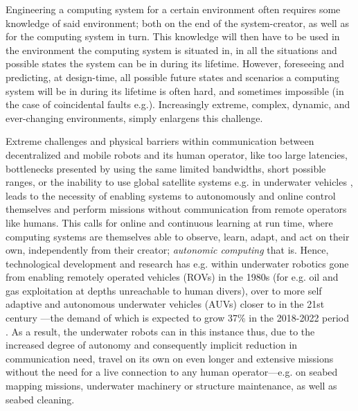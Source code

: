 
Engineering a computing system for a certain environment often requires some knowledge of said environment; both on the end of the system-creator, as well as for the computing system in turn. This knowledge will then have to be used in the environment the computing system is situated in, in all the situations and possible states the system can be in during its lifetime. However, foreseeing and predicting, at design-time, all possible future states and scenarios a computing system will be in during its lifetime is often hard, and sometimes impossible (in the case of coincidental faults e.g.). Increasingly extreme, complex, dynamic, and ever-changing environments, simply enlargens this challenge.

Extreme challenges and physical barriers within communication between decentralized and mobile robots and its human operator, like too large latencies, bottlenecks presented by using the same limited bandwidths, short possible ranges, or the inability to use global satellite systems e.g. in underwater vehicles \cite{petillot_underwater_robots}, leads to the necessity of enabling systems to autonomously and online control themselves and perform missions without communication from remote operators like humans. This calls for online and continuous learning at run time, where computing systems are themselves able to observe, learn, adapt, and act on their own, independently from their creator; \textit{autonomic computing} that is. Hence, technological development and research has e.g. within underwater robotics gone from enabling remotely operated vehicles (ROVs) in the 1980s (for e.g. oil and gas exploitation at depths unreachable to human divers), over to more self adaptive and autonomous underwater vehicles (AUVs) closer to in the 21st century —the demand of which is expected to grow 37\% in the 2018-2022 period \cite{petillot_underwater_robots}. As a result, the underwater robots can in this instance thus, due to the increased degree of autonomy and consequently implicit reduction in communication need, travel on its own on even longer and extensive missions without the need for a live connection to any human operator—e.g. on seabed mapping missions, underwater machinery or structure maintenance, as well as seabed cleaning.


